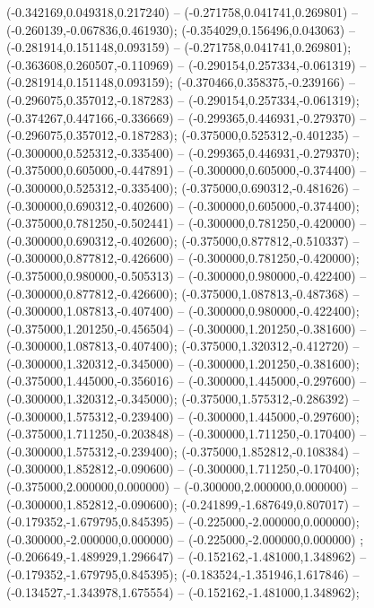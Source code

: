  (-0.342169,0.049318,0.217240) -- (-0.271758,0.041741,0.269801) -- (-0.260139,-0.067836,0.461930);
 (-0.354029,0.156496,0.043063) -- (-0.281914,0.151148,0.093159) -- (-0.271758,0.041741,0.269801);
 (-0.363608,0.260507,-0.110969) -- (-0.290154,0.257334,-0.061319) -- (-0.281914,0.151148,0.093159);
 (-0.370466,0.358375,-0.239166) -- (-0.296075,0.357012,-0.187283) -- (-0.290154,0.257334,-0.061319);
 (-0.374267,0.447166,-0.336669) -- (-0.299365,0.446931,-0.279370) -- (-0.296075,0.357012,-0.187283);
 (-0.375000,0.525312,-0.401235) -- (-0.300000,0.525312,-0.335400) -- (-0.299365,0.446931,-0.279370);
 (-0.375000,0.605000,-0.447891) -- (-0.300000,0.605000,-0.374400) -- (-0.300000,0.525312,-0.335400);
 (-0.375000,0.690312,-0.481626) -- (-0.300000,0.690312,-0.402600) -- (-0.300000,0.605000,-0.374400);
 (-0.375000,0.781250,-0.502441) -- (-0.300000,0.781250,-0.420000) -- (-0.300000,0.690312,-0.402600);
 (-0.375000,0.877812,-0.510337) -- (-0.300000,0.877812,-0.426600) -- (-0.300000,0.781250,-0.420000);
 (-0.375000,0.980000,-0.505313) -- (-0.300000,0.980000,-0.422400) -- (-0.300000,0.877812,-0.426600);
 (-0.375000,1.087813,-0.487368) -- (-0.300000,1.087813,-0.407400) -- (-0.300000,0.980000,-0.422400);
 (-0.375000,1.201250,-0.456504) -- (-0.300000,1.201250,-0.381600) -- (-0.300000,1.087813,-0.407400);
 (-0.375000,1.320312,-0.412720) -- (-0.300000,1.320312,-0.345000) -- (-0.300000,1.201250,-0.381600);
 (-0.375000,1.445000,-0.356016) -- (-0.300000,1.445000,-0.297600) -- (-0.300000,1.320312,-0.345000);
 (-0.375000,1.575312,-0.286392) -- (-0.300000,1.575312,-0.239400) -- (-0.300000,1.445000,-0.297600);
 (-0.375000,1.711250,-0.203848) -- (-0.300000,1.711250,-0.170400) -- (-0.300000,1.575312,-0.239400);
 (-0.375000,1.852812,-0.108384) -- (-0.300000,1.852812,-0.090600) -- (-0.300000,1.711250,-0.170400);
 (-0.375000,2.000000,0.000000) -- (-0.300000,2.000000,0.000000) -- (-0.300000,1.852812,-0.090600);
 (-0.241899,-1.687649,0.807017) -- (-0.179352,-1.679795,0.845395) -- (-0.225000,-2.000000,0.000000);
 (-0.300000,-2.000000,0.000000) -- (-0.225000,-2.000000,0.000000) ;
 (-0.206649,-1.489929,1.296647) -- (-0.152162,-1.481000,1.348962) -- (-0.179352,-1.679795,0.845395);
 (-0.183524,-1.351946,1.617846) -- (-0.134527,-1.343978,1.675554) -- (-0.152162,-1.481000,1.348962);
